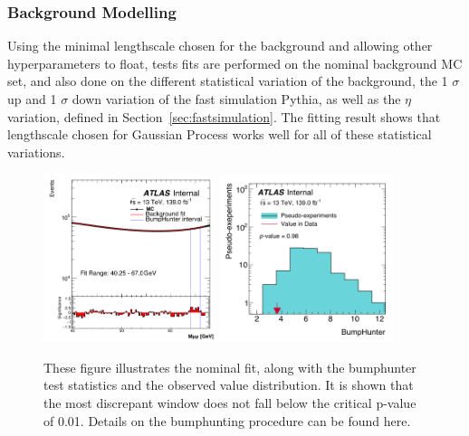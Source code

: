 \subsubsection{Background Modelling}
Using the minimal lengthscale chosen for the background and allowing other hyperparameters to float, tests fits are performed on the nominal background MC set, and also done on the different statistical variation of the background, the 1 $\sigma$ up and 1 $\sigma$ down variation of the fast simulation Pythia, as well as the $\eta$ variation, defined in Section~\ref{sec:fastsimulation}.
The fitting result shows that lengthscale chosen for Gaussian Process works well for all of these statistical variations. 

\begin{figure}[!htb]
    \begin{center}
        \includegraphics[width=0.45\textwidth]{figures/chapter_dimuon/Nominal}        
        \includegraphics[width=0.45\textwidth]{figures/chapter_dimuon/NominalBH}        
        \caption{
        These figure illustrates the nominal fit, along with the bumphunter test statistics and the observed value distribution. It is shown that the most discrepant window does not fall below the critical p-value of 0.01. Details on the bumphunting procedure can be found here. 
        }
        \label{fig:bumphunterstats}
    \end{center}
\end{figure}
\FloatBarrier

